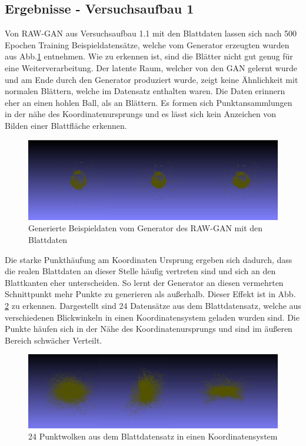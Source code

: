 \documentclass{llncs}
\begin{document}
\subsection{Ergebnisse - Versuchsaufbau 1}

Von RAW-GAN aus Versuchsaufbau 1.1 mit den Blattdaten lassen sich nach 500 Epochen Training Beispieldatensätze, welche vom Generator erzeugten wurden aus Abb.\ref{fig:Bild100} entnehmen. Wie zu erkennen ist, sind die Blätter nicht gut genug für eine Weiterverarbeitung. Der latente Raum, welcher von den GAN gelernt wurde und am Ende durch den Generator produziert wurde, zeigt keine Ähnlichkeit mit normalen Blättern, welche im Datensatz enthalten waren. Die Daten erinnern eher an einen hohlen Ball, als an Blättern. Es formen sich Punktansammlungen in der nähe des Koordinatenursprungs und es lässt sich kein Anzeichen von Bilden einer Blattfläche erkennen.
\begin{figure}[htbp] 
	\centering
	\includegraphics[width=1.0\textwidth]{raw_gan_leaf_example.png}
	\caption{Generierte Beispieldaten vom Generator des RAW-GAN mit den Blattdaten}
	\label{fig:Bild100}
\end{figure}
Die starke Punkthäufung am Koordinaten Ursprung ergeben sich dadurch, dass die realen Blattdaten an dieser Stelle häufig vertreten sind und sich an den Blattkanten eher unterscheiden. So lernt der Generator an diesen vermehrten Schnittpunkt mehr Punkte zu generieren als außerhalb. Dieser Effekt ist in Abb. \ref{fig:Bild81} zu erkennen. Dargestellt sind 24 Datensätze aus dem Blattdatensatz, welche aus verschiedenen Blickwinkeln in einen Koordinatensystem geladen wurden sind. Die Punkte häufen sich in der Nähe des Koordinatenursprungs und sind im äußeren Bereich schwächer Verteilt. 
\begin{figure}[htbp] 
	\centering
	\includegraphics[width=1.0\textwidth]{ansammlung.png}
	\caption{24 Punktwolken aus dem Blattdatensatz in einen Koordinatensystem}
	\label{fig:Bild81}
\end{figure}
\end{document}
